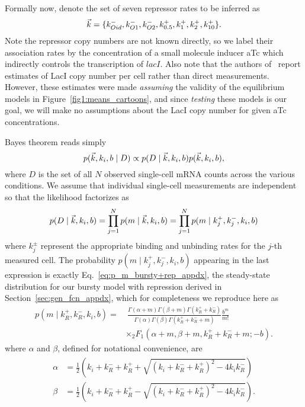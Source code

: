 Formally now, denote the set of seven repressor rates to be inferred as
\begin{equation}
\vec{k} =\{k_{Oid}^-, k_{O1}^-, k_{O2}^-,
k_{0.5}^+, k_{1}^+, k_{2}^+, k_{10}^+\}.
\end{equation}
Note the repressor copy numbers are not known directly, so we label their
association rates by the concentration of a small molecule inducer aTc
which indirectly controls the transcription of $\textit{lacI}$.
Also note that the authors of~\cite{Jones2014} report estimates
of LacI copy number per cell rather than direct measurements.
However, these estimates were made \textit{assuming} the validity
of the equilibrium models in Figure~\ref{fig1:means_cartoons},
and since \textit{testing} these models is our goal, we will make
no assumptions about the LacI copy number for given aTc concentrations.

Bayes theorem reads simply
\begin{equation}
p(\vec{k}, k_i, b \mid D)
\propto
p(D \mid\vec{k}, k_i, b) p(\vec{k}, k_i, b),
\end{equation}
where $D$ is the set of all $N$ observed single-cell mRNA counts
across the various conditions. We assume that individual single-cell
measurements are independent so that the likelihood factorizes as
\begin{equation}
p(D \mid\vec{k}, k_i, b)
= \prod_{j=1}^N p(m\mid \vec{k}, k_i, b)
= \prod_{j=1}^N p(m\mid k_j^+, k_j^-, k_i, b)
\end{equation}
where $k_j^\pm$ represent the appropriate binding and unbinding
rates for the $j$-th measured cell. The probability
$p(m\mid k_j^+, k_j^-, k_i, b)$ appearing in the last expression
is exactly Eq.~\ref{eq:p_m_bursty+rep_appdx}, the steady-state
distribution for our bursty model with repression derived in
Section~\ref{sec:gen_fcn_appdx}, which for completeness we reproduce here as
\begin{equation}
\begin{split}
p(m \mid k_R^+, k_R^-, k_i, b) = & ~\frac{
        \Gamma(\alpha + m)\Gamma(\beta + m)\Gamma(k_R^+ + k_R^-)
        }
        {
        \Gamma(\alpha)\Gamma(\beta)\Gamma(k_R^+ + k_R^- + m)
        }
\frac{b^m}{m!}
\\
&\times {_2F_1}(\alpha+m, \beta+m, k_R^++k_R^-+m; -b).
\end{split}
\label{eq:p_m_bursty+rep}
\end{equation}
where $\alpha$ and $\beta$, defined for notational convenience, are
\begin{align}
\begin{split}
\alpha &= \frac{1}{2}
\left(k_i+k_R^-+k_R^+ + \sqrt{(k_i+k_R^-+k_R^+)^2 - 4k_i k_R^-}\right)
\\
\beta &= \frac{1}{2}
\left(k_i+k_R^-+k_R^+ - \sqrt{(k_i+k_R^-+k_R^+)^2 - 4k_i k_R^-}\right).
\end{split}
\end{align}

